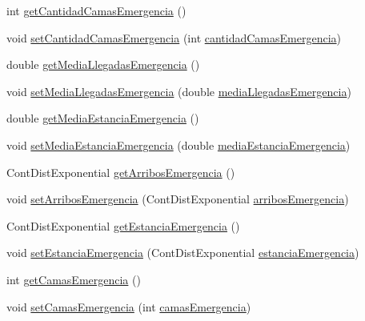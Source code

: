 \begin{DoxyCompactItemize}
int \hyperlink{class_modelo_hospital_a32ad20b8cd00111e971a2e1fbd5e2846}{get\-Cantidad\-Camas\-Emergencia} ()
\item 
void \hyperlink{class_modelo_hospital_ac5b372c3755661cb94d1697a272b6923}{set\-Cantidad\-Camas\-Emergencia} (int \hyperlink{class_modelo_hospital_a399104f28dff59862c839e754af5858b}{cantidad\-Camas\-Emergencia})
\item 
double \hyperlink{class_modelo_hospital_a9c481c295b65b1f77afa1fe06b1b05ad}{get\-Media\-Llegadas\-Emergencia} ()
\item 
void \hyperlink{class_modelo_hospital_a8a9a80239c2d8b13c89e7202b8eb38f9}{set\-Media\-Llegadas\-Emergencia} (double \hyperlink{class_modelo_hospital_a8c82045a833cf70bce0e81b87e77d91a}{media\-Llegadas\-Emergencia})
\item 
double \hyperlink{class_modelo_hospital_a6499bb304800ae18bec2f6dd62ba6ac3}{get\-Media\-Estancia\-Emergencia} ()
\item 
void \hyperlink{class_modelo_hospital_a52dd26c1ab4bc8afd883c8f9617436f9}{set\-Media\-Estancia\-Emergencia} (double \hyperlink{class_modelo_hospital_a251f7d9ddab04b2fb1e9ff101b3a3354}{media\-Estancia\-Emergencia})
\item 
Cont\-Dist\-Exponential \hyperlink{class_modelo_hospital_aedeec1aa6b0808defec18d2896322222}{get\-Arribos\-Emergencia} ()
\item 
void \hyperlink{class_modelo_hospital_a72adc5c0b478eb8ed58002a005d7f49f}{set\-Arribos\-Emergencia} (Cont\-Dist\-Exponential \hyperlink{class_modelo_hospital_aa508c4132ba981b9520f843dc24561e4}{arribos\-Emergencia})
\item 
Cont\-Dist\-Exponential \hyperlink{class_modelo_hospital_a89f98296bc582af6df104c4e32a3b573}{get\-Estancia\-Emergencia} ()
\item 
void \hyperlink{class_modelo_hospital_a8ba5a635a30938fba92f3594f081c38c}{set\-Estancia\-Emergencia} (Cont\-Dist\-Exponential \hyperlink{class_modelo_hospital_a6c710d90f7333974d066f761b23688c1}{estancia\-Emergencia})
\item 
int \hyperlink{class_modelo_hospital_a9edf287fe12a81a36d15685d0d18382e}{get\-Camas\-Emergencia} ()
\item 
void \hyperlink{class_modelo_hospital_a0f817fd9a6d476436bc2dd2b960885b0}{set\-Camas\-Emergencia} (int \hyperlink{class_modelo_hospital_ad9062f6156719fa8052f4cafe877f8b0}{camas\-Emergencia})
\end{DoxyCompactItemize}
